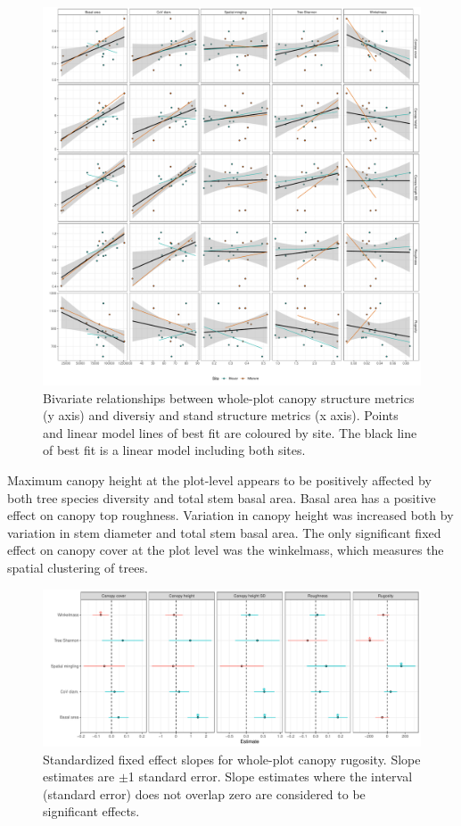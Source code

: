 \documentclass[11pt,a4paper]{article}
\begin{document}
\begin{figure}[H]
\centering
	\includegraphics[width=\textwidth]{canopy_rough_mod_bivar}
	\caption{Bivariate relationships between whole-plot canopy structure metrics (y axis) and diversiy and stand structure metrics (x axis). Points and linear model lines of best fit are coloured by site. The black line of best fit is a linear model including both sites.}
	\label{canopy_rough_mod_bivar}
\end{figure}

Maximum canopy height at the plot-level appears to be positively affected by both tree species diversity and total stem basal area. Basal area has a positive effect on canopy top roughness. Variation in canopy height was increased both by variation in stem diameter and total stem basal area. The only significant fixed effect on canopy cover at the plot level was the winkelmass, which measures the spatial clustering of trees.

\begin{figure}[H]
\centering
	\includegraphics[width=\textwidth]{canopy_rough_slopes}
	\caption{Standardized fixed effect slopes for whole-plot canopy rugosity. Slope estimates are $\pm$1 standard error. Slope estimates where the interval (standard error) does not overlap zero are considered to be significant effects.}
	\label{canopy_rough_slopes}
\end{figure}
\end{document}
